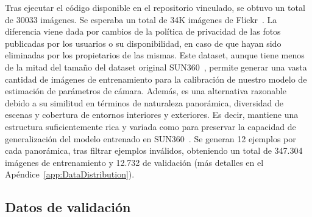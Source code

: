 Tras ejecutar el código disponible en el repositorio vinculado, se obtuvo un total de 30033 imágenes.
Se esperaba un total de 34K imágenes de Flickr~\cite{SPEC}. La diferencia viene dada por cambios
de la política de privacidad de las fotos publicadas por los usuarios o su disponibilidad, en caso
de que hayan sido eliminadas por los propietarios de las mismas. Este dataset, aunque tiene menos de la
mitad del tamaño del dataset original SUN360~\cite{SUN360}, permite generar una vasta cantidad
de imágenes de entrenamiento para la calibración de nuestro modelo de estimación de parámetros de cámara.
Además, es una alternativa razonable debido a su similitud en términos de naturaleza panorámica, diversidad
de escenas y cobertura de entornos interiores y exteriores. Es decir, mantiene una estructura suficientemente
rica y variada como para preservar la capacidad de generalización del modelo entrenado en SUN360~\cite{SUN360}.
Se generan 12 ejemplos por cada panorámica, tras filtrar ejemplos inválidos, obteniendo un total de 347.304 imágenes de entrenamiento y 12.732 de validación
(más detalles en el Apéndice~\ref{app:DataDistribution}).

\subsection{Datos de validación}\label{sec:EvaluationData}
